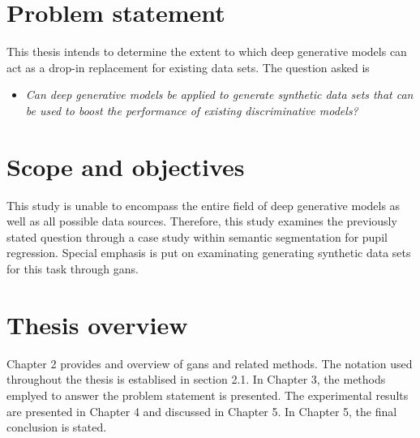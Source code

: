 \section{Problem statement}
This thesis intends to determine the extent to which deep generative models can act as a drop-in replacement for existing data sets. The question asked is

\begin{itemize}
    \item \textit{Can deep generative models be applied to generate synthetic data sets that can be used to boost the performance of existing discriminative models?}
\end{itemize}


\section{Scope and objectives}
This study is unable to encompass the entire field of deep generative models as well as all possible data sources. Therefore, this study examines the previously stated question through a case study within semantic segmentation for pupil regression. Special emphasis is put on examinating generating synthetic data sets for this task through \acrlong{gans}.

\section{Thesis overview}
Chapter 2 provides and overview of \acrlong{gans} and related methods. The notation used throughout the thesis is establised in section 2.1. In Chapter 3, the methods emplyed to answer the problem statement is presented. The experimental results are presented in Chapter 4 and discussed in Chapter 5. In Chapter 5, the final conclusion is stated.



